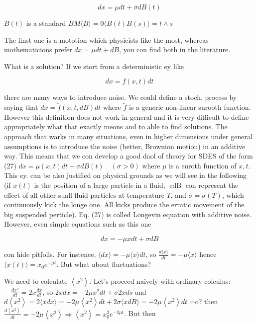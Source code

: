 $$
 d x=\mu d t+\sigma d B(t)
$$ 

$B(t)$ is a standard $B M \langle B\rangle=0\langle B(t) B(s)\rangle=t \wedge s$

The finst one is a mototion which physicists like the most, whereas mothematicions prefer $d x=\mu d t+d B$, you con find both in the literature.

What is a solution?
If we stort from a deterministic ey like

$$
 d x=f(x, t) d t
$$ 

there are many ways to introduce noise. We could define a stoch. process by saying that $d x=\tilde{f}(x, t, d B) d t$ where $\tilde{f}$ is a generic non-linear surooth function. However this definition does not work in general and it is very difficult to define appropriately what that exactly meons and to able to find solutions.
The approach that warks in many situations, even in higher dimensions under general assumptions is to introduce the noise (better, Brownion motion) in an additive way. This means that we con develop
a good daol of theory for SDES of the form
(27) $d x=\mu(x, t) d t+\sigma d B(t) \quad(\sigma>0)$
where $\mu$ is a suroth function of $x, t$. This ey. can be also justified on physical grounds as we will see in the following (if $x(t)$ is the position of a large particle in a fluid, $\operatorname{cdB}$ con represent the effect of all other suall fluid particles at temperature $T$, and $\sigma=\sigma(T)$, which continuously kick the longe one. All kicks produce the erratic movement of the big suspended perticle).
Eq. (27) is colled Longevin equation with additive noise.
However, even simple equations such as this one

$$
 d x=-\mu x d t+\sigma d B
$$ 

con hide pitfolls. For instence, $\langle d x\rangle=-\mu\langle x\rangle d t$, so $\frac{d\langle x\rangle}{d t}=-\mu\langle x\rangle$ hence $\langle x(t)\rangle=x_{0} e^{-\mu t}$. But what about fluctuations?

We need to colculate $\left\langle x^{2}\right\rangle$. Let's proceed naively with ordinary colculus: $\quad \frac{d x^{2}}{d t}=2 x \frac{d x}{d t}$, so $2 x d x=-2 \mu x^{2} d t+\sigma 2 x d s$ and $d\left\langle x^{2}\right\rangle=2\langle x d x\rangle=-2 \mu\left\langle x^{2}\right\rangle d t+2 \sigma\langle x d B\rangle=-2 \mu\left\langle x^{2}\right\rangle d t$ =o?
then $\frac{d\left\langle x^{2}\right\rangle}{d t}=-2 \mu\left\langle x^{2}\right\rangle \Rightarrow\left\langle x^{2}\right\rangle=x_{0}^{2} e^{-2 \mu t}$. But then

